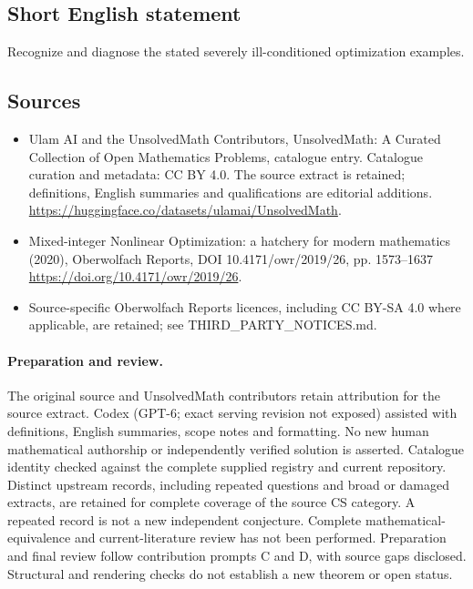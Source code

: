 \documentclass[11pt]{article}
\begin{document}
\subsection{Short English statement}
Recognize and diagnose the stated severely ill-conditioned optimization examples.
\subsection{Sources}
\begin{itemize}
\item[\hypertarget{source:statement:1}{S1}] Ulam AI and the UnsolvedMath Contributors, UnsolvedMath: A Curated Collection of Open Mathematics Problems, catalogue entry. Catalogue curation and metadata: CC BY 4.0. The source extract is retained; definitions, English summaries and qualifications are editorial additions.
\url{https://huggingface.co/datasets/ulamai/UnsolvedMath}.
\item[\hypertarget{source:statement:2}{S2}] Mixed-integer Nonlinear Optimization: a hatchery for modern mathematics (2020), Oberwolfach Reports, DOI 10.4171/owr/2019/26, pp. 1573--1637
\url{https://doi.org/10.4171/owr/2019/26}.
\item Source-specific Oberwolfach Reports licences, including CC BY-SA 4.0 where applicable, are retained; see THIRD\_PARTY\_NOTICES.md.
\end{itemize}
\paragraph{Preparation and review.}
The original source and UnsolvedMath contributors retain attribution for the source extract. Codex (GPT-6; exact serving revision not exposed) assisted with definitions, English summaries, scope notes and formatting. No new human mathematical authorship or independently verified solution is asserted. Catalogue identity checked against the complete supplied registry and current repository. Distinct upstream records, including repeated questions and broad or damaged extracts, are retained for complete coverage of the source CS category. A repeated record is not a new independent conjecture. Complete mathematical-equivalence and current-literature review has not been performed. Preparation and final review follow contribution prompts C and D, with source gaps disclosed. Structural and rendering checks do not establish a new theorem or open status.
\label{end:statement}
\end{document}

